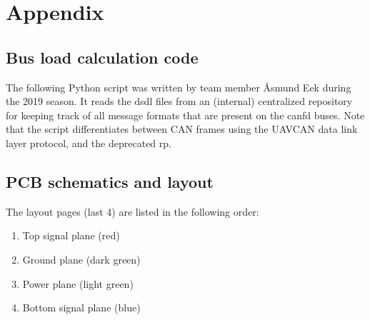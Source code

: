 \section*{Appendix}

\subsection*{Bus load calculation code}

The  following Python script was written by team member Åsmund Eek during the 2019 season. It reads the \acrshort{dsdl} files from an (internal) centralized repository for keeping track of all message formats that are present on the \acrshort{canfd} buses. Note that the script differentiates between CAN frames using the UAVCAN data link layer protocol, and the deprecated \acrfull{rp}.



\newpage
\subsection*{PCB schematics and layout}

The layout pages (last 4) are listed in the following order:

\begin{enumerate}
    \item Top signal plane (red)
    \item Ground plane (dark green)
    \item Power plane (light green)
    \item Bottom signal plane (blue)
\end{enumerate}



